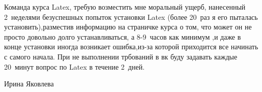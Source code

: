 \documentclass[12pt, a4paper]{article}
\begin{document}
Команда курса Latex, требую возместить мне моральный ущерб, нанесенный 2~неделями безуспешных попыток установки Latex (более 20~раз я его пыталась установить),разместив информацию на страничке курса о том, что может он не просто довольно долго устанавливаться, а 8-9~часов как минимум ,и даже в конце установки иногда возникает ошибка,из-за которой приходится все начинать с самого начала. При не выполнении трбований  в вк буду задавать каждые 20~минут вопрос по Latex в течение 2~дней.

Ирина Яковлева
\end{document}
